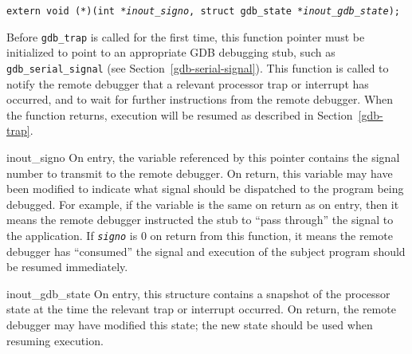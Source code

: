 \label{gdb-signal}
\begin{apisyn}

	{\tt extern void (*)(int *\emph{inout_signo},
				struct gdb_state *\emph{inout_gdb_state});}
\end{apisyn}
\begin{apidesc}
	Before {\tt gdb_trap} is called for the first time,
	this function pointer must be initialized
	to point to an appropriate GDB debugging stub,
	such as {\tt gdb_serial_signal} (see Section~\ref{gdb-serial-signal}).
	This function is called to notify the remote debugger
	that a relevant processor trap or interrupt has occurred,
	and to wait for further instructions from the remote debugger.
	When the function returns, execution will be resumed
	as described in Section~\ref{gdb-trap}.
\end{apidesc}
\begin{apiparm}
	\item[inout_signo]
		On entry, the variable referenced by this pointer
		contains the signal number to transmit to the remote debugger.
		On return, this variable may have been modified
		to indicate what signal should be dispatched
		to the program being debugged.
		For example, if the variable is the same on return as on entry,
		then it means the remote debugger instructed the stub
		to ``pass through'' the signal to the application.
		If {\tt *\emph{signo}} is 0 on return from this function,
		it means the remote debugger has ``consumed'' the signal
		and execution of the subject program
		should be resumed immediately.
	\item[inout_gdb_state]
		On entry, this structure contains
		a snapshot of the processor state
		at the time the relevant trap or interrupt occurred.
		On return, the remote debugger may have modified this state;
		the new state should be used when resuming execution.
\end{apiparm}


